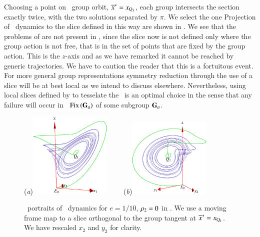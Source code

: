 Choosing a point on \reqv\ group orbit,
${\overline{x}^*}  = x_{\mathrm{Q}_{1}}$,
each group intersects the section exactly twice,  with the
two solutions separated by $\pi$. We select the one 
 
Projection of \cLe\ dynamics to the slice defined in this way are
shown in . We see that the problems of
 are not present in , since
the slice now is not defined only where the group action is not free,
that is in the set of points that are fixed by the group action. This
is the $z$-axis and as we have remarked it cannot be reached by generic
trajectories. We have to caution the reader that this is a fortuitous
event. For more general group representations symmetry reduction through
the use of a slice will be at best local as we intend to discuss
elsewhere. Nevertheless, using local slices defined by 
to tesselate the \reducedsp\ is an optimal choice in the sense that any
failure will occur in \fixedsp\ $\mathrm{Fix}\left(\mathbf{G}_a\right)$ of some subgroup
$\mathbf{G}_a$.


\begin{figure}[ht]
\begin{center}
  (\textit{a})\includegraphics[width=0.35\textwidth,clip=true]{../figs/CLEmfReqb1}
~~~~(\textit{b})\includegraphics[width=0.35\textwidth,clip=true]{../figs/CLEmfReqb}
\end{center}
\caption{ \Statesp\
portraits of \cLe\ dynamics for $e=1/10$, $\rho_2=0$
in \reducedsp. We use a moving frame map to a slice orthogonal
to the group tangent at  ${\overline{x}^*}  = x_{\mathrm{Q}_{1}}$. We have rescaled $x_2$ and $y_2$
for clarity.
    }
\label{fig:CLEmfReqb1}
\end{figure}

